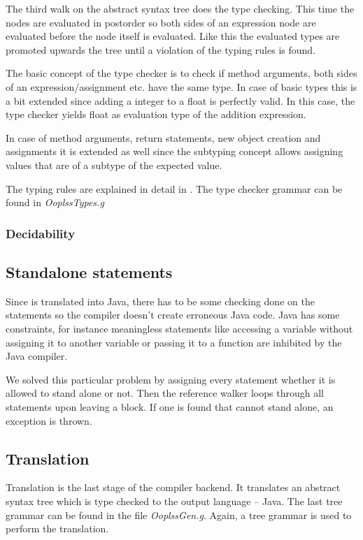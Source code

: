 The third walk on the abstract syntax tree does the type checking. This
time the nodes are evaluated in postorder so both sides of an expression
node are evaluated before the node itself is evaluated. Like this the
evaluated types are promoted upwards the tree until a violation of the
typing rules is found.

The basic concept of the type checker is to check if method arguments, 
both sides of an expression/assignment etc. have the same type. In case
of basic types this is a bit extended since adding a integer to a float 
is perfectly valid. In this case, the type checker yields float as evaluation
type of the addition expression.

In case of method arguments, return statements, new object creation 
and assignments it is extended as well since the subtyping concept 
allows assigning values that are of a subtype of the expected value.

The typing rules are explained in detail in . The
type checker grammar can be found in \emph{OoplssTypes.g}

\subsubsection{Decidability}

\subsection{Standalone statements}

Since \ooplss is translated into Java, there has to be some checking
done on the statements so the compiler doesn't create erroneous Java
code. Java has some constraints, for instance meaningless statements
like accessing a variable without assigning it to another variable
or passing it to a function are inhibited by the Java compiler.

We solved this particular problem by assigning every statement whether
it is allowed to stand alone or not. Then the reference walker loops 
through all statements upon leaving a block. If one is found that cannot
stand alone, an exception is thrown.

\subsection{Translation}
Translation is the last stage of the compiler backend. It
translates an abstract syntax tree which is type checked to the
output language -- Java. The last tree grammar can be found in the
file \emph{OoplssGen.g}. Again, a tree grammar is used to perform the
translation.

